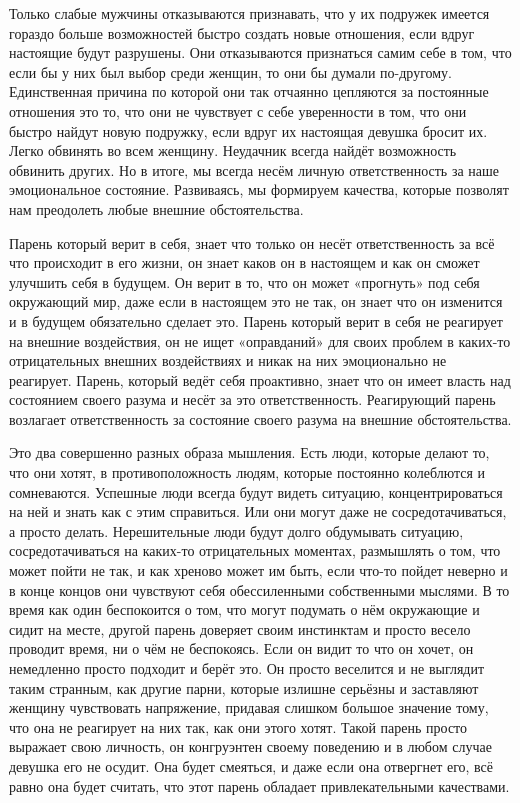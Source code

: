 Только слабые мужчины отказываются признавать, что у их подружек имеется гораздо больше возможностей быстро создать новые отношения, если вдруг настоящие будут разрушены. Они отказываются признаться самим себе в том, что если бы у них был выбор среди женщин, то они бы думали по-другому. Единственная причина по которой они так отчаянно цепляются за постоянные отношения это то, что они не чувствует с себе уверенности в том, что они быстро найдут новую подружку, если вдруг их настоящая девушка бросит их. Легко обвинять во всем женщину. Неудачник всегда найдёт возможность обвинить других. Но в итоге, мы всегда несём личную ответственность за наше эмоциональное состояние. Развиваясь, мы формируем качества, которые позволят нам преодолеть любые внешние обстоятельства.

Парень который верит в себя, знает что только он несёт ответственность за всё что происходит в его жизни, он знает каков он в настоящем и как он сможет улучшить себя в будущем. Он верит в то, что он может «прогнуть» под себя окружающий мир, даже если в настоящем это не так, он знает что он изменится и в будущем обязательно сделает это. Парень который верит в себя не реагирует на внешние воздействия, он не ищет «оправданий» для своих проблем в каких-то отрицательных внешних воздействиях и никак на них эмоционально не реагирует. Парень, который ведёт себя проактивно, знает что он имеет власть над состоянием своего разума и несёт за это ответственность. Реагирующий парень возлагает ответственность за состояние своего разума на внешние обстоятельства.

Это два совершенно разных образа мышления. Есть люди, которые делают то, что они хотят, в противоположность людям, которые постоянно колеблются и сомневаются. Успешные люди всегда будут видеть ситуацию, концентрироваться на ней и знать как с этим справиться. Или они могут даже не сосредотачиваться, а просто делать. Нерешительные люди будут долго обдумывать ситуацию, сосредотачиваться на каких-то отрицательных моментах, размышлять о том, что может пойти не так, и как хреново может им быть, если что-то пойдет неверно и в конце концов они чувствуют себя обессиленными собственными мыслями. В то время как один беспокоится о том, что могут подумать о нём окружающие и сидит на месте, другой парень доверяет своим инстинктам и просто весело проводит время, ни о чём не беспокоясь. Если он видит то что он хочет, он немедленно просто подходит и берёт это. Он просто веселится и не выглядит таким странным, как другие парни, которые излишне серьёзны и заставляют женщину чувствовать напряжение, придавая слишком большое значение тому, что она не реагирует на них так, как они этого хотят. Такой парень просто выражает свою личность, он конгруэнтен своему поведению и в любом случае девушка его не осудит. Она будет смеяться, и даже если она отвергнет его, всё равно она будет считать, что этот парень обладает привлекательными качествами.

